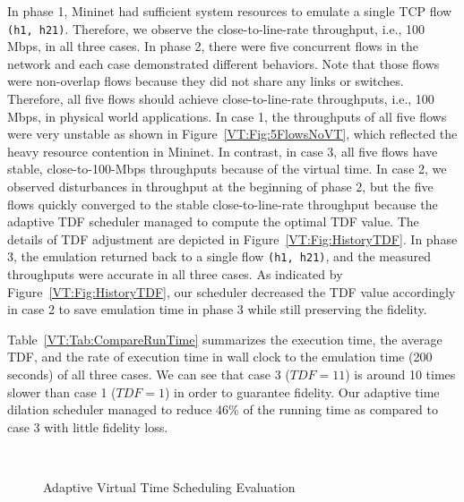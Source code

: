 In phase 1, Mininet had sufficient system resources to emulate a single TCP flow \texttt{(h1, h21)}.
Therefore, we observe the close-to-line-rate throughput, i.e., 100 Mbps, in all three cases.
In phase 2, there were five concurrent flows in the network and each case demonstrated different behaviors.
Note that those flows were non-overlap flows because they did not share any links or switches.
Therefore, all five flows should achieve close-to-line-rate throughputs, i.e., 100 Mbps, in physical world applications.
In case 1, the throughputs of all five flows were very unstable as shown in Figure~\ref{VT:Fig:5FlowsNoVT},
which reflected the heavy resource contention in Mininet.
In contrast, in case 3, all five flows have stable, close-to-100-Mbps throughputs because of the virtual time.
In case 2, we observed disturbances in throughput at the beginning of phase 2,
but the five flows quickly converged to the stable close-to-line-rate throughput because the adaptive TDF scheduler managed to compute the optimal TDF value.
The details of TDF adjustment are depicted in Figure~\ref{VT:Fig:HistoryTDF}.
In phase 3, the emulation returned back to a single flow \texttt{(h1, h21)}, and the measured throughputs were accurate in all three cases.
As indicated by Figure~\ref{VT:Fig:HistoryTDF}, our scheduler decreased the TDF value accordingly
in case 2 to save emulation time in phase 3 while still preserving the fidelity.

Table~\ref{VT:Tab:CompareRunTime} summarizes the execution time, the average TDF,
and the rate of execution time in wall clock to the emulation time (200 seconds) of all three cases. 
We can see that case 3 ($TDF = 11$) is around 10 times slower than case 1 ($TDF = 1$) in order to guarantee fidelity.
Our adaptive time dilation scheduler managed to reduce 46\% of the running time as compared to case 3 with little fidelity loss. 

\begin{figure}
\centering
    \\
\caption{Adaptive Virtual Time Scheduling Evaluation}
\label{VT:Fig:Adaptive}
\end{figure}

